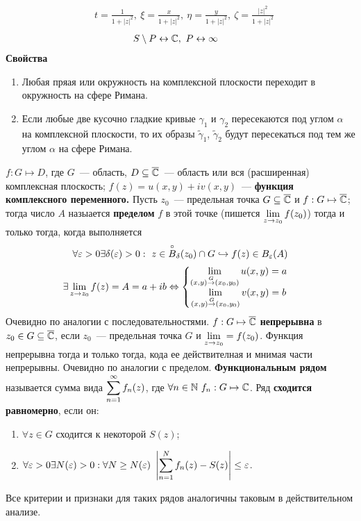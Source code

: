 \begin{align*}
  & t = \frac{1}{1+ \left| z \right|^2}, \ \xi = \frac{x}{1+ \left| z \right|^2}, \ \eta = \frac{y}{1+ \left| z \right|^2}, \ \zeta = \frac{\left| z \right|^2}{1+ \left| z \right|^2}
\end{align*}
\begin{align*}
  & S \setminus P \leftrightarrow \mathbb{C}, \ P \leftrightarrow \infty
\end{align*}
\textbf{Свойства}
\begin{enumerate}
    \item Любая пряая или окружность на комплексной плоскости переходит в
    окружность на сфере Римана.
    \item Если любые две кусочно гладкие кривые $\gamma_1$ и $\gamma_2$
    пересекаются под углом $\alpha$ на комплексной плоскости, то их образы
    $\tilde{\gamma}_1$, $\tilde{\gamma}_2$ будут пересекаться под тем же углом
    $\alpha$ на сфере Римана.
\end{enumerate}
\Def
$f: G \mapsto D$, где $G$~--- область, $D \subseteq \overline{\mathbb{C}}$~--- область или вся
(расширенная) комплексная плоскость; $f(z) = u(x,y) + iv(x,y)$~---
\textbf{функция комплексного переменного.}
\Def
Пусть $z_0$~--- предельная точка $G \subseteq \overline{\mathbb{C}}$ и $f: G \mapsto \overline{\mathbb{C}}$; тогда
число $A$ назыается \textbf{пределом} $f$ в этой точке (пишется $\displaystyle \lim_{z \to
  z_0} f(z_0)$) тогда и только тогда, когда выполняется
\begin{equation}\label{(2.3)}
    \forall \varepsilon > 0 \exists \delta(\varepsilon) > 0: \ z \in \overset{\circ}{B}_\delta(z_0)\cap G \hookrightarrow f(z) \in B_\varepsilon (A)
\end{equation}
\asm
\begin{align*}
  & \exists \lim_{z \to z_0}f(z) = A = a+ib \Leftrightarrow \left\{ \begin{matrix}
          \displaystyle \lim_{(x,y)\overset{G}{\to}(x_0,y_0)}u(x,y) = a \\
          \displaystyle \lim_{(x,y)\overset{G}{\to}(x_0,y_0)}v(x,y) = b
      \end{matrix} \right.
\end{align*}
\pr
Очевидно по аналогии с последовательностями.
\Def
$f: G \mapsto \overline{\mathbb{C}}$ \textbf{непрерывна} в $z_0 \in G \subseteq \overline{\mathbb{C}}$, если
$z_0$~--- предельная точка $G$ и $\displaystyle \lim_{z \to z_0} = f(z_0)$.
\asm
Функция непрерывна тогда и только тогда, кода ее действителная и мнимая части
непрерывны.
\pr Очевидно по аналогии с пределом.
\Def
\textbf{Функциональным рядом} называется сумма вида $\displaystyle \sum_{n=1}^\infty
f_n(z)$, где $\forall n \in \mathbb{N} \ f_n :G \mapsto \mathbb{C}$.
\Def
Ряд \textbf{сходится равномерно}, если он:
\begin{enumerate}
    \item $\forall z \in G$ сходится к некоторой $S(z)$;
    \item $\forall \varepsilon > 0 \exists N(\varepsilon) > 0: \forall N \geq N
    (\varepsilon) \ \left| \displaystyle \sum_{n=1}^Nf_n(z) - S(z) \right|\leq
    \varepsilon$.
\end{enumerate}
Все критерии и признаки для таких рядов аналогичны таковым в действительном
анализе.    